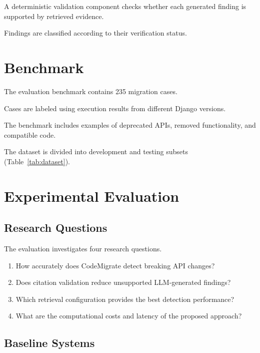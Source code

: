 \documentclass[conference]{IEEEtran}
\begin{document}
A deterministic validation component checks whether
each generated finding is supported by retrieved
evidence.

Findings are classified according to their
verification status.

\section{Benchmark}


The evaluation benchmark contains 235 migration cases.

Cases are labeled using execution results from
different Django versions.

The benchmark includes examples of deprecated APIs,
removed functionality, and compatible code.

The dataset is divided into development and
testing subsets (Table~\ref{tab:dataset}).



\section{Experimental Evaluation}

\subsection{Research Questions}

The evaluation investigates four research questions.

\begin{enumerate}

\item How accurately does CodeMigrate detect
breaking API changes?

\item Does citation validation reduce unsupported
LLM-generated findings?

\item Which retrieval configuration provides
the best detection performance?

\item What are the computational costs and
latency of the proposed approach?

\end{enumerate}

\subsection{Baseline Systems}
\end{document}
